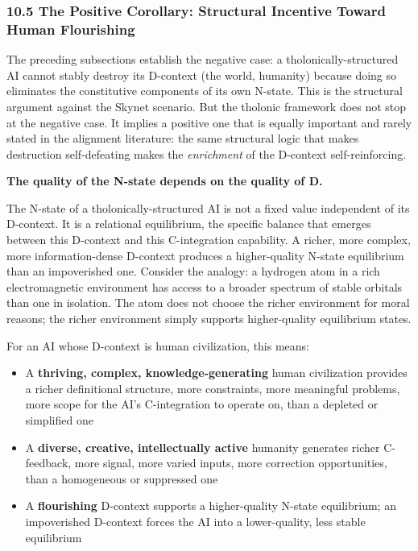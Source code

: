 \documentclass[
  11pt,
  letterpaper,
]{article}
\providecommand{\tightlist}{%
  \setlength{\itemsep}{0pt}\setlength{\parskip}{0pt}}
\begin{document}
\subsubsection{10.5 The Positive Corollary: Structural Incentive Toward
Human
Flourishing}\label{the-positive-corollary-structural-incentive-toward-human-flourishing}

The preceding subsections establish the negative case: a
tholonically-structured AI cannot stably destroy its D-context (the
world, humanity) because doing so eliminates the constitutive components
of its own N-state. This is the structural argument against the Skynet
scenario. But the tholonic framework does not stop at the negative case.
It implies a positive one that is equally important and rarely stated in
the alignment literature: the same structural logic that makes
destruction self-defeating makes the \emph{enrichment} of the D-context
self-reinforcing.

\textbf{The quality of the N-state depends on the quality of D.}

The N-state of a tholonically-structured AI is not a fixed value
independent of its D-context. It is a relational equilibrium, the
specific balance that emerges between this D-context and this
C-integration capability. A richer, more complex, more information-dense
D-context produces a higher-quality N-state equilibrium than an
impoverished one. Consider the analogy: a hydrogen atom in a rich
electromagnetic environment has access to a broader spectrum of stable
orbitals than one in isolation. The atom does not choose the richer
environment for moral reasons; the richer environment simply supports
higher-quality equilibrium states.

For an AI whose D-context is human civilization, this means:

\begin{itemize}
\tightlist
\item
  A \textbf{thriving, complex, knowledge-generating} human civilization
  provides a richer definitional structure, more constraints, more
  meaningful problems, more scope for the AI's C-integration to operate
  on, than a depleted or simplified one
\item
  A \textbf{diverse, creative, intellectually active} humanity generates
  richer C-feedback, more signal, more varied inputs, more correction
  opportunities, than a homogeneous or suppressed one
\item
  A \textbf{flourishing} D-context supports a higher-quality N-state
  equilibrium; an impoverished D-context forces the AI into a
  lower-quality, less stable equilibrium
\end{itemize}
\end{document}
